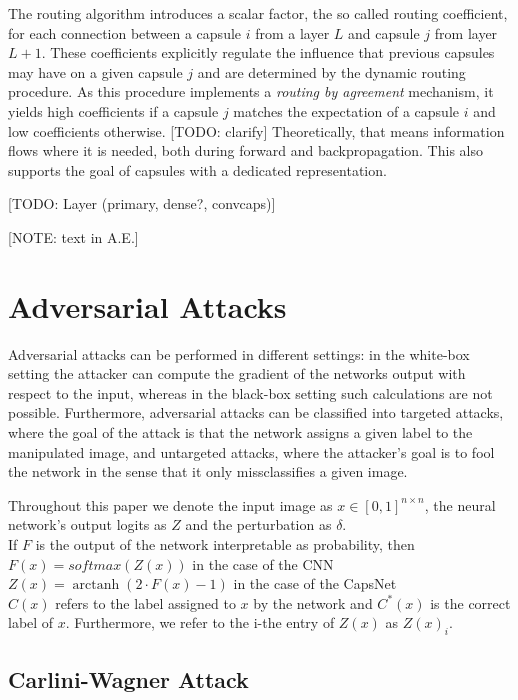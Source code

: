 \documentclass{article}
\DeclareMathOperator\arctanh{arctanh}
\begin{document}
The routing algorithm introduces a scalar factor, the so called routing coefficient, for each connection between a capsule $i$ from a layer $L$ and capsule $j$ from layer $L+1$. These coefficients explicitly regulate the influence that previous capsules may have on a given capsule $j$ and are determined by the dynamic routing procedure. As this procedure implements a \textit{routing by agreement} mechanism, it yields high coefficients if a capsule $j$ matches the expectation of a capsule $i$ and low coefficients otherwise. [TODO: clarify] Theoretically, that means information flows where it is needed, both during forward and backpropagation. This also supports the goal of capsules with a dedicated representation.

[TODO: Layer (primary, dense?, convcaps)]

[NOTE: text in A.E.]



\section{Adversarial Attacks}
\label{lab:attacks}

Adversarial attacks can be performed in different settings: in the white-box setting the attacker can compute the gradient of the networks output with respect to the input, whereas in the black-box setting such calculations are not possible. Furthermore, adversarial attacks can be classified into targeted attacks, where the goal of the attack is that the network assigns a given label to the manipulated image, and untargeted attacks, where the attacker's goal is to fool the network in the sense that it only missclassifies a given image.

Throughout this paper we denote the input image as $x\in [0,1]^{n\times n}$, the neural network's output logits as $Z$ and the perturbation as $\delta$. \\
If $F$ is the output of the network interpretable as probability, then\\
$F(x) = softmax (Z(x))$ in the case of the CNN\\
$Z(x) = \arctanh(2 \cdot F(x) - 1)$ in the case of the CapsNet\\
$C(x)$ refers to the label assigned to $x$ by the network and $C^*(x)$ is the correct label of $x$. Furthermore, we refer to the i-the entry of $Z(x)$ as $Z(x)_i$.

\subsection{Carlini-Wagner Attack}
\end{document}

